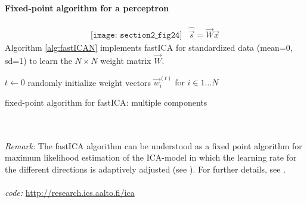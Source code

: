 \paragraph{Fixed-point algorithm for a perceptron}
\[ \begin{array}{ll}
	\texttt{[image: section2\_fig24]}
	& \widehat{\vec{s}} = \vec{W} \vec{x}
\end{array} \]
Algorithm \ref{alg:fastICAN} implements fastICA for standardized data (mean=0, sd=1) to learn the $N \times N$ weight matrix $\vec{W}$.
\begin{algorithm}
  \DontPrintSemicolon
  $t \leftarrow 0$\;
  randomly initialize weight vectors $\vec{w}_i^{(t)}\; \text{for } i \in 1 \dots N$\; 
  \caption{fixed-point algorithm for fastICA: multiple components}
  \label{alg:fastICAN}
\end{algorithm}
\\\\
\emph{Remark:} The fastICA algorithm can be understood as a fixed point algorithm for maximum likelihood estimation of the ICA-model in which the learning rate for the different directions is adaptively adjusted (see \cite[p. 424]{HyvaerinenOja2000}). For further details, see \textcite[ch. 8.4]{HyvaerinenEtAl2001}. 
\\\\
\emph{code:} \url{http://research.ics.aalto.fi/ica}\\

